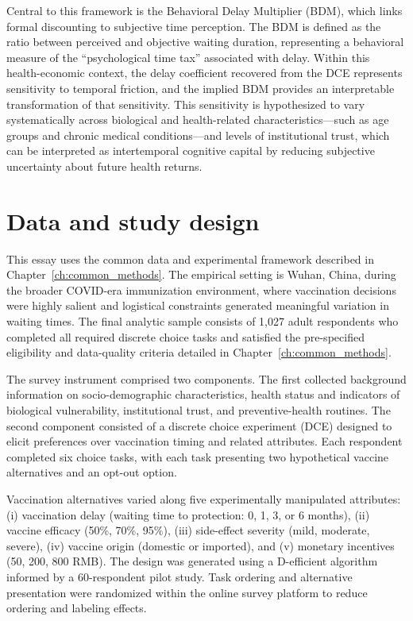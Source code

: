 \documentclass[doublespacing]{utdthesis}
\begin{document}
Central to this framework is the Behavioral Delay Multiplier (BDM), which links formal discounting to subjective time perception. The BDM is defined as the ratio between perceived and objective waiting duration, representing a behavioral measure of the ``psychological time tax'' associated with delay. Within this health-economic context, the delay coefficient recovered from the DCE represents sensitivity to temporal friction, and the implied BDM provides an interpretable transformation of that sensitivity. This sensitivity is hypothesized to vary systematically across biological and health-related characteristics---such as age groups and chronic medical conditions---and levels of institutional trust, which can be interpreted as intertemporal cognitive capital by reducing subjective uncertainty about future health returns.


\section{Data and study design}
\label{sec:essay1_data}

This essay uses the common data and experimental framework described in Chapter~\ref{ch:common_methods}. The empirical setting is Wuhan, China, during the broader COVID-era immunization environment, where vaccination decisions were highly salient and logistical constraints generated meaningful variation in waiting times. The final analytic sample consists of 1{,}027 adult respondents who completed all required discrete choice tasks and satisfied the pre-specified eligibility and data-quality criteria detailed in Chapter~\ref{ch:common_methods}.

The survey instrument comprised two components. The first collected background information on socio-demographic characteristics, health status and indicators of biological vulnerability, institutional trust, and preventive-health routines. The second component consisted of a discrete choice experiment (DCE) designed to elicit preferences over vaccination timing and related attributes. Each respondent completed six choice tasks, with each task presenting two hypothetical vaccine alternatives and an opt-out option.

Vaccination alternatives varied along five experimentally manipulated attributes: (i) vaccination delay (waiting time to protection: 0, 1, 3, or 6 months), (ii) vaccine efficacy (50\%, 70\%, 95\%), (iii) side-effect severity (mild, moderate, severe), (iv) vaccine origin (domestic or imported), and (v) monetary incentives (50, 200, 800 RMB). The design was generated using a D-efficient algorithm informed by a 60-respondent pilot study. Task ordering and alternative presentation were randomized within the online survey platform to reduce ordering and labeling effects.
\end{document}
